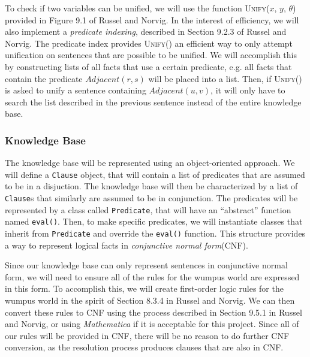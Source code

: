 \documentclass{article}
\begin{document}
				To check if two variables can be unified, we will use the function \textsc{Unify}($x$, $y$, $\theta$) provided in Figure 9.1 of Russel and Norvig.
				In the interest of efficiency, we will also implement a \textit{predicate indexing}, described in Section 9.2.3 of Russel and Norvig\cite{ai}.
				The predicate index provides \textsc{Unify}() an efficient way to only attempt unification on sentences that are possible to be unified. 
				We will accomplish this by constructing lists of all facts that use a certain predicate, e.g. all facts that contain the predicate $Adjacent(r,s)$ will be placed into a list.
				Then, if \textsc{Unify()} is asked to unify a sentence containing $Adjacent(u,v)$, it will only have to search the list described in the previous sentence instead of the entire knowledge base.
				
			\subsubsection{Knowledge Base}
			
				The knowledge base will be represented using an object-oriented approach.
				We will define a \texttt{Clause} object, that will contain a list of predicates that are assumed to be in a disjuction. The knowledge base will then be characterized by a list of \texttt{Clause}s that similarly are assumed to be in conjunction. 
				The predicates will be represented by a class called \texttt{Predicate}, that will have an ``abstract'' function named \texttt{eval()}.
				Then, to make specific predicates, we will instantiate classes that inherit from \texttt{Predicate} and override the \texttt{eval()} function.
				This structure provides a way to represent logical facts in \textit{conjunctive normal form}(CNF).
				
				Since our knowledge base can only represent sentences in conjunctive normal form, we will need to ensure all of the rules for the wumpus world are expressed in this form.
				To accomplish this, we will create first-order logic rules for the wumpus world in the spirit of Section 8.3.4 in Russel and Norvig.
				We can then convert these rules to CNF using the process described in Section 9.5.1 in Russel and Norvig, or using \textit{Mathematica} if it is acceptable for this project.
				Since all of our rules will be provided in CNF, there will be no reason to do further CNF conversion, as the resolution process produces clauses that are also in CNF.
				
\end{document}
